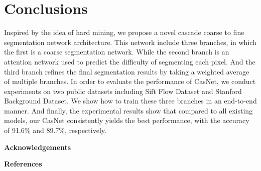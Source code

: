 \documentclass[10.5pt,compsoc]{TsT}
\theoremstyle{mystyle}
\begin{document}
\section{Conclusions}
\noindent

Inspired by the idea of hard mining, we propose a novel cascade coarse to fine segmentation network architecture.
This network include three branches, in which the first is a coarse segmentation network.
While the second branch is an attention network used to predict the difficulty of segmenting each pixel.
And the third branch refines the final segmentation results by taking a weighted average of multiple branches.
In order to evaluate the performance of CasNet, we conduct experiments on two public datasets including Sift Flow Dataset and Stanford Background Dataset. 
We show how to train these three branches in an end-to-end manner. And finally, the experimental results show that compared to all existing models, our CasNet consistently yields the best performance, with the accuracy of 91.6\% and 89.7\%, respectively.


\vskip 2mm
\noindent
\textbf{Acknowledgements}
\vskip 2mm

\noindent

\vskip 2mm
\noindent
\textbf{References}
\vskip 2mm
\end{document}
